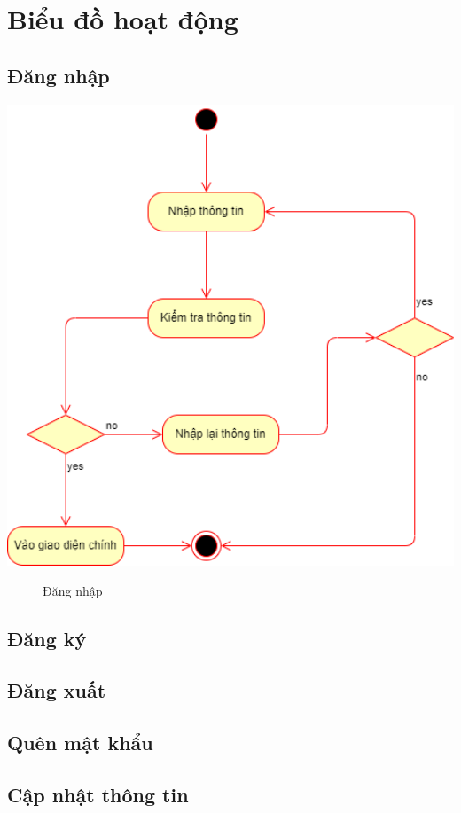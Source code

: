 \section{Biểu đồ hoạt động}
\subsection{Đăng nhập}

  \begin{center}
    \includegraphics[width=1.1\textwidth]{image/activity/login.png}
    \begin{figure}
      \centering
      \caption{Đăng nhập}
    \end{figure}
  \end{center}

\subsection{Đăng ký}
\subsection{Đăng xuất}
\subsection{Quên mật khẩu}
\subsection{Cập nhật thông tin}

